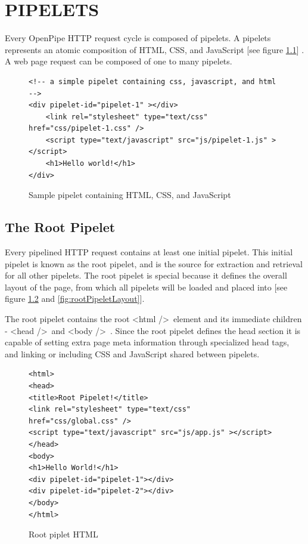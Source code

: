 \documentclass[12pt]{report}
\begin{document}
\chapter{PIPELETS}

Every OpenPipe HTTP request cycle is composed of pipelets. A pipelets represents an atomic composition of HTML, CSS, and JavaScript [see figure \ref{fig:samplePipelet}] . A web page request can be composed of one to many pipelets.

\begin{figure}[H]
\label{fig:samplePipelet}
\begin{lstlisting}
<!-- a simple pipelet containing css, javascript, and html -->
<div pipelet-id="pipelet-1" ></div>
	<link rel="stylesheet" type="text/css" href="css/pipelet-1.css" />
	<script type="text/javascript" src="js/pipelet-1.js" ></script>
	<h1>Hello world!</h1>
</div>
\end{lstlisting}
\caption{Sample pipelet containing HTML, CSS, and JavaScript}
\end{figure}


\section{The Root Pipelet}
Every pipelined HTTP request contains at least one initial pipelet. This initial pipelet is known as the root pipelet, and is the source for extraction and retrieval for all other pipelets. The root pipelet is special because it defines the overall layout of the page, from which all pipelets will be loaded and placed into [see figure \ref{fig:sampleRootPipelet} and \ref{fig:rootPipeletLayout}]. 
	
The root pipelet contains the root \textless html /\textgreater\ element and its immediate children - \textless head /\textgreater\ and \textless body /\textgreater\	. Since the root pipelet defines the head section it is capable of setting extra page meta information through specialized head tags, and linking or including CSS and JavaScript shared between pipelets.

\begin{figure}[H]
\label{fig:sampleRootPipelet}
\begin{lstlisting}
<html>
<head>
<title>Root Pipelet!</title>
<link rel="stylesheet" type="text/css" href="css/global.css" />
<script type="text/javascript" src="js/app.js" ></script>
</head>
<body>
<h1>Hello World!</h1>
<div pipelet-id="pipelet-1"></div>
<div pipelet-id="pipelet-2"></div>
</body>
</html>
\end{lstlisting}
\caption{Root piplet HTML}
\end{figure}
\end{document}
